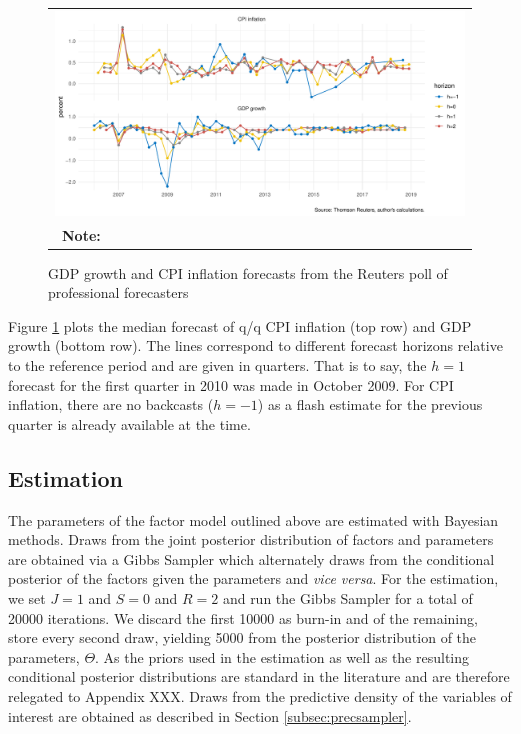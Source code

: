 \documentclass[notitlepage,a4paper,12pt]{article}
\begin{document}
\begin{figure}[htbp] \centering
    \caption{GDP growth and CPI inflation forecasts from the Reuters poll of professional forecasters \label{fig:reuterspoll}}
    \footnotesize
    \begin{tabular}{p{16cm}}
    \multicolumn{1}{c}{\includegraphics*[scale = 0.6]{../figures/fig_ReutersPoll.pdf}} \\
    {
    \footnotesize \textbf{Note:} 
    }
    \end{tabular}
    \newline
    \normalsize
\end{figure}

Figure \ref{fig:reuterspoll} plots the median forecast of q/q CPI inflation (top row) and GDP growth (bottom row). The lines correspond to different forecast horizons relative to the reference period and are given in quarters. That is to say, the $h=1$ forecast for the first quarter in 2010 was made in October 2009. For CPI inflation, there are no backcasts ($h=-1$) as a flash estimate for the previous quarter is already available at the time.  
 

\subsection{Estimation}

The parameters of the factor model outlined above are estimated with Bayesian methods. Draws from the joint posterior distribution of factors and parameters are obtained via a Gibbs Sampler which alternately draws from the conditional posterior of the factors given the parameters and \textit{vice versa}. For the estimation, we set $J=1$ and $S=0$ and $R=2$ and run the Gibbs Sampler for a total of 20000 iterations. We discard the first 10000 as burn-in and of the remaining, store every second draw, yielding 5000 from the posterior distribution of the parameters, $\Theta$. As the priors used in the estimation as well as the resulting conditional posterior distributions are standard in the literature and are therefore relegated to Appendix XXX. Draws from the predictive density of the variables of interest are obtained as described in Section \ref{subsec:precsampler}.
\end{document}
